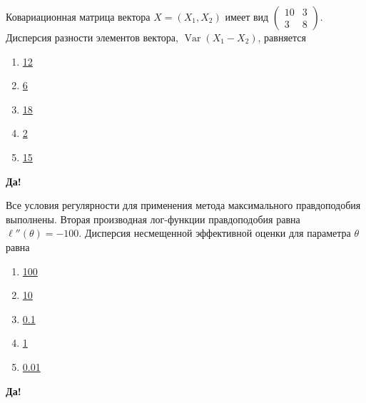 \documentclass[t]{beamer}
\DeclareMathOperator{\Var}{Var}
\begin{document}
 \begin{frame} \label{17-Yes} 
\begin{block}{17} 

Ковариационная матрица вектора $X=(X_1,X_2)$ имеет вид
$
\begin{pmatrix}
10 & 3 \\
3 & 8
\end{pmatrix}
$.
Дисперсия разности элементов вектора, $\Var(X_1-X_2)$, равняется
 


 \end{block} 
\begin{enumerate} 
\item[] \hyperlink{17-Yes}{\beamergotobutton{} 12}
\item[] \hyperlink{17-No}{\beamergotobutton{} 6}
\item[] \hyperlink{17-No}{\beamergotobutton{} 18}
\item[] \hyperlink{17-No}{\beamergotobutton{} 2}
\item[] \hyperlink{17-No}{\beamergotobutton{} 15}
\end{enumerate} 

 \textbf{Да!} 
 \hyperlink{18}{}\end{frame} 


 \begin{frame} \label{18-Yes} 
\begin{block}{18} 

Все условия регулярности для применения метода максимального правдоподобия выполнены. Вторая производная лог-функции правдоподобия равна $\ell''(\theta)=-100$. Дисперсия несмещенной эффективной оценки для параметра $\theta$ равна
 


 \end{block} 
\begin{enumerate} 
\item[] \hyperlink{18-No}{\beamergotobutton{} 100}
\item[] \hyperlink{18-No}{\beamergotobutton{} 10}
\item[] \hyperlink{18-No}{\beamergotobutton{} 0.1}
\item[] \hyperlink{18-No}{\beamergotobutton{} 1}
\item[] \hyperlink{18-Yes}{\beamergotobutton{} 0.01}
\end{enumerate} 

 \textbf{Да!} 
 \hyperlink{19}{}\end{frame} 
\end{document}
